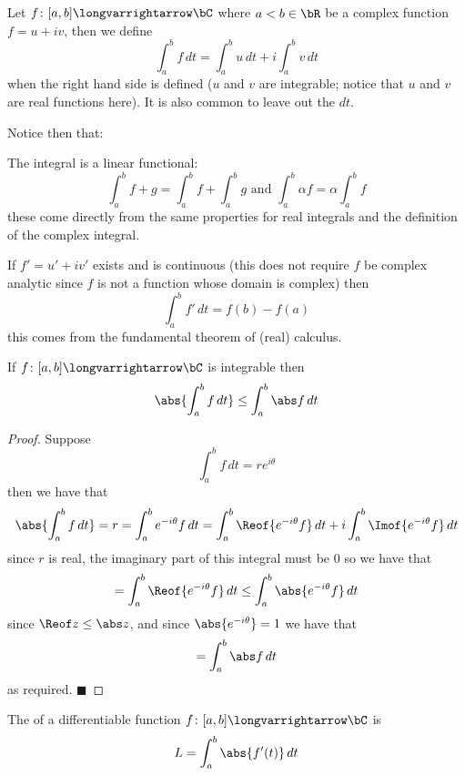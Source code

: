 \documentclass[10pt]{article}
\let\longto=\longvarrightarrow
\def\qed{\hskip1cm\hbox{}\hfill$\blacksquare$}
\begin{document}
\begin{defn*}

    Let $f\colon[a,b]\longto\bC$ where $a<b\in\bR$ be a complex function $f=u+iv$, then we define
    \[ \int_a^b f\,dt = \int_a^b u\,dt + i\int_a^b v\,dt \]
    when the right hand side is defined ($u$ and $v$ are integrable; notice that $u$ and $v$ are real functions here).
    It is also common to leave out the $dt$.

\end{defn*}

Notice then that:
\benum
    \item The integral is a linear functional:
    \[ \int_a^b f+g = \int_a^b f+\int_a^b g \text{ and } \int_a^b \alpha f = \alpha\int_a^b f \]
    these come directly from the same properties for real integrals and the definition of the complex integral.
    \item If $f'=u'+iv'$ exists and is continuous (this does not require $f$ be complex analytic since $f$ is not a function whose domain is complex) then
    \[ \int_a^b f'\,dt = f(b) - f(a) \]
    this comes from the fundamental theorem of (real) calculus.
\eenum

\begin{prop*}

    If $f\colon[a,b]\longto\bC$ is integrable then
    \[ \abs{\int_a^b f\,dt} \leq \int_a^b\abs f\,dt \]

\end{prop*}

\begin{proof}

    Suppose
    \[ \int_a^b f\,dt = re^{i\theta} \]
    then we have that
    \[ \abs{\int_a^b f\,dt} = r = \int_a^b e^{-i\theta}f\,dt = \int_a^b \Reof{e^{-i\theta}f}\,dt + i\int_a^b \Imof{e^{-i\theta}f}\,dt \]
    since $r$ is real, the imaginary part of this integral must be $0$ so we have that
    \[ = \int_a^b\Reof{e^{-i\theta}f}\,dt \leq \int_a^b \abs{e^{-i\theta}f}\,dt \]
    since $\Reof z\leq\abs z$, and since $\abs{e^{-i\theta}}=1$ we have that
    \[ = \int_a^b \abs f\,dt \]
    as required.
    \qed

\end{proof}

\begin{defn*}

    The  of a differentiable function $f\colon[a,b]\longto\bC$ is
    \[ L = \int_a^b\abs{f'(t)}\,dt \]

\end{defn*}
\end{document}
